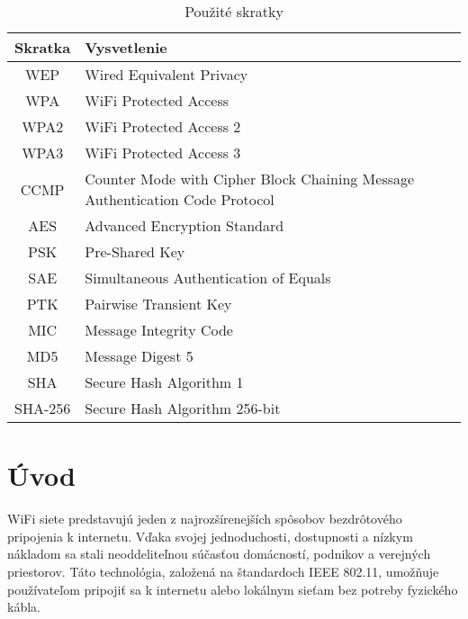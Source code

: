 \documentclass[12pt, twoside]{book}
\begin{document}
\newpage
\begin{table}[H]
\begin{center}
\renewcommand\thetable{1}
\caption{Použité skratky}
\begin{tabular}{ |c|C{10cm}| } 
 \hline
\textbf{Skratka} & \textbf{Vysvetlenie} 
 \\ \hline
WEP  & Wired Equivalent Privacy
\\ \hline
WPA  & WiFi Protected Access
\\ \hline
WPA2  & WiFi Protected Access 2
\\ \hline
WPA3  & WiFi Protected Access 3
\\ \hline
CCMP  & Counter Mode with Cipher Block Chaining Message Authentication Code Protocol
\\ \hline
AES  & Advanced Encryption Standard
\\ \hline
PSK  & Pre-Shared Key
\\ \hline
SAE & Simultaneous Authentication of Equals
\\ \hline
PTK & Pairwise Transient Key
\\ \hline
MIC & Message Integrity Code
\\ \hline
MD5 & Message Digest 5
\\ \hline
SHA & Secure Hash Algorithm 1
\\ \hline
SHA-256 & Secure Hash Algorithm 256-bit
\\ \hline
\end{tabular}
\end{center}
\end{table}




\newpage

\pagestyle{fancy}
\setcounter{page}{1}

\fancyhf{} 
\renewcommand{\headrulewidth}{0pt}
\fancyfoot[C]{\thepage}
\renewcommand\thesection{\arabic{section}}


\section{Úvod}
WiFi siete predstavujú jeden z najrozšírenejších spôsobov bezdrôtového pripojenia k internetu. Vďaka svojej jednoduchosti, dostupnosti a nízkym nákladom sa stali neoddeliteľnou súčasťou domácností, podnikov a verejných priestorov. Táto technológia, založená na štandardoch IEEE 802.11, umožňuje používateľom pripojiť sa k internetu alebo lokálnym sieťam bez potreby fyzického kábla.
\end{document}
